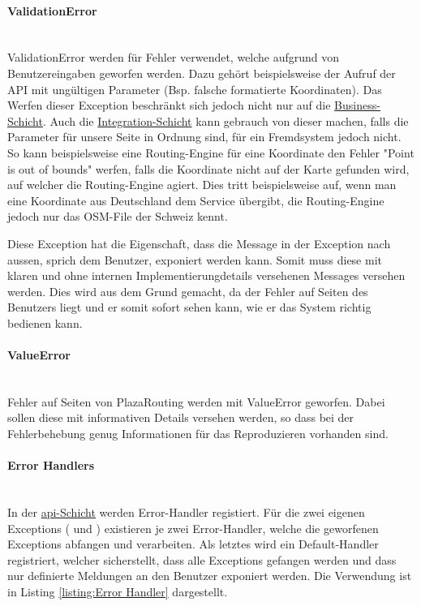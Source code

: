 \paragraph{ValidationError}\label{ehp:PR:ValidationErrorr}~\\
ValidationError werden für Fehler verwendet, welche aufgrund von Benutzereingaben geworfen werden. Dazu gehört beispielsweise der Aufruf der \ac{API} mit ungültigen Parameter (Bsp. falsche formatierte Koordinaten). Das Werfen dieser Exception beschränkt sich jedoch nicht nur auf die \hyperref[architektur:business-layer]{Business-Schicht}. Auch die \hyperref[architektur:integration-layer]{Integration-Schicht} kann gebrauch von dieser machen, falls die Parameter für unsere Seite in Ordnung sind, für ein Fremdsystem jedoch nicht. So kann beispielsweise eine Routing-Engine für eine Koordinate den Fehler "Point is out of bounds" werfen, falls die Koordinate nicht auf der Karte gefunden wird, auf welcher die Routing-Engine agiert. Dies tritt beispielsweise auf, wenn man eine Koordinate aus Deutschland dem Service übergibt, die Routing-Engine jedoch nur das \ac{OSM}-File der Schweiz kennt.

Diese Exception hat die Eigenschaft, dass die Message in der Exception nach aussen, sprich dem Benutzer, exponiert werden kann. Somit muss diese mit klaren und ohne internen Implementierungdetails versehenen Messages versehen werden. Dies wird aus dem Grund gemacht, da der Fehler auf Seiten des Benutzers liegt und er somit sofort sehen kann, wie er das System richtig bedienen kann.

\paragraph{ValueError}\label{ehp:PR:ValueError}~\\
Fehler auf Seiten von PlazaRouting werden mit ValueError geworfen. Dabei sollen diese mit informativen Details versehen werden, so dass bei der Fehlerbehebung genug Informationen für das Reproduzieren vorhanden sind.

\paragraph{Error Handlers}\label{ehp:Error Handlers}~\\
In der \hyperref[architektur:api-layer]{api-Schicht} werden Error-Handler registiert. Für die zwei eigenen Exceptions ( und ) existieren je zwei Error-Handler, welche die geworfenen Exceptions abfangen und verarbeiten. Als letztes wird ein Default-Handler registriert, welcher sicherstellt, dass alle Exceptions gefangen werden und dass nur definierte Meldungen an den Benutzer exponiert werden. Die Verwendung ist in Listing \ref{listing:Error Handler} dargestellt.

